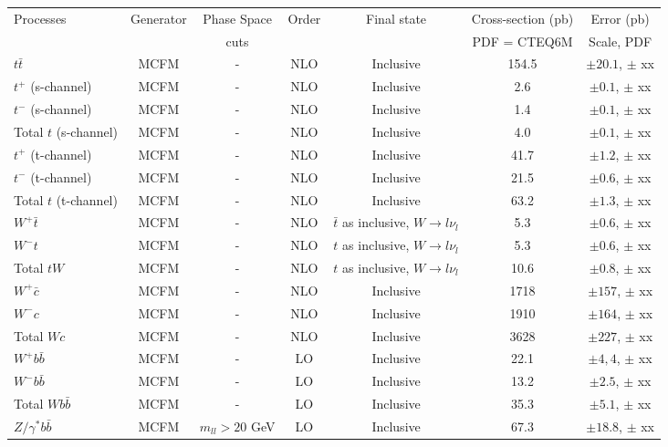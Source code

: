 \vspace{3mm}
\begin{table}[hbt]
\begin{center}
\renewcommand{\arraystretch}{1.2}
\begin{tabular}{|l|c|c|c|c|c|c|}\hline
Processes & Generator & Phase Space& Order & Final state & Cross-section (pb)& Error (pb) \\ 
 &  &  cuts & & & PDF = CTEQ6M & Scale, PDF \\ \hline
$t\bar{t}$ & MCFM & - & NLO & Inclusive & 154.5 & $\pm 20.1$, $\pm$ xx \\ \hline
$t^+$ (s-channel) & MCFM & - & NLO & Inclusive & 2.6 & $\pm 0.1$, $\pm$ xx \\ \hline
$t^-$ (s-channel) & MCFM & - & NLO & Inclusive & 1.4 & $\pm 0.1$, $\pm$ xx \\ \hline
Total $t$ (s-channel) & MCFM & - & NLO & Inclusive & 4.0 & $\pm 0.1$, $\pm$ xx \\ \hline
$t^+$ (t-channel) & MCFM & - & NLO & Inclusive & 41.7 & $\pm 1.2$, $\pm$ xx \\ \hline
$t^-$ (t-channel) & MCFM & - & NLO & Inclusive & 21.5 & $\pm 0.6$, $\pm$ xx \\ \hline
Total $t$ (t-channel) & MCFM & - & NLO & Inclusive & 63.2 & $\pm 1.3$, $\pm$ xx \\ \hline
$W^+ \bar{t}$ & MCFM & - & NLO & $\bar{t}$ as inclusive, $W\rightarrow l \nu_l$ & 5.3 & $\pm 0.6$, $\pm$ xx \\ \hline
$W^- t$ & MCFM & - & NLO & $t$ as inclusive, $W\rightarrow l \nu_l$ & 5.3 & $\pm 0.6$, $\pm$ xx \\ \hline
Total $tW$ & MCFM & - & NLO & $t$ as inclusive, $W\rightarrow l \nu_l$ & 10.6 & $\pm 0.8$, $\pm$ xx \\ \hline
$W^+ \bar{c}$ & MCFM & - & NLO & Inclusive & 1718 & $\pm 157$, $\pm$ xx \\ \hline
$W^- c$ & MCFM & - & NLO & Inclusive & 1910 & $\pm 164$, $\pm$ xx \\ \hline
Total $Wc$ & MCFM & - & NLO & Inclusive & 3628 & $\pm 227$, $\pm$ xx \\ \hline
$W^+ b\bar{b}$ & MCFM & - & LO & Inclusive & 22.1 & $\pm 4,4$, $\pm$ xx \\ \hline
$W^- b\bar{b}$ & MCFM & - & LO & Inclusive & 13.2 & $\pm 2.5$, $\pm$ xx \\ \hline
Total $Wb\bar{b}$ & MCFM & - & LO & Inclusive & 35.3 & $\pm 5.1$, $\pm$ xx \\ \hline
$Z/\gamma^* b\bar{b}$ & MCFM & $m_{ll} > 20$ GeV & LO & Inclusive & 67.3 & $\pm 18.8$, $\pm$ xx \\ \hline

\end{tabular}
\end{center}
\end{table}
